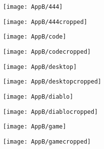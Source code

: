 \documentclass[draft,final]{vutinfth} %
\begin{document}
\begin{appendices}
			\begin{figure}[H]
			\centering
			\begin{subfigure}[b]{0.45\columnwidth}
				\centering
				\texttt{[image: AppB/444]}
			\end{subfigure}
			\begin{subfigure}[b]{0.45\columnwidth}
				\centering
				\texttt{[image: AppB/444cropped]}
			\end{subfigure}
		\end{figure}  
		\begin{figure}[H]
			\centering
			\begin{subfigure}[b]{0.45\columnwidth}
				\centering
				\texttt{[image: AppB/code]}
			\end{subfigure}
			\begin{subfigure}[b]{0.45\columnwidth}
				\centering
				\texttt{[image: AppB/codecropped]}
			\end{subfigure}
		\end{figure}
		\begin{figure}[H]
			\centering
			\begin{subfigure}[b]{0.45\columnwidth}
				\centering
				\texttt{[image: AppB/desktop]}
			\end{subfigure}
			\begin{subfigure}[b]{0.45\columnwidth}
				\centering
				\texttt{[image: AppB/desktopcropped]}
			\end{subfigure}
		\end{figure}
		\begin{figure}[H]
			\centering
			\begin{subfigure}[b]{0.45\columnwidth}
				\centering
				\texttt{[image: AppB/diablo]}
			\end{subfigure}
			\begin{subfigure}[b]{0.45\columnwidth}
				\centering
				\texttt{[image: AppB/diablocropped]}
			\end{subfigure}
		\end{figure} 
		\begin{figure}[H]
			\centering
			\begin{subfigure}[b]{0.45\columnwidth}
				\centering
				\texttt{[image: AppB/game]}
			\end{subfigure}
			\begin{subfigure}[b]{0.45\columnwidth}
				\centering
				\texttt{[image: AppB/gamecropped]}

\end{subfigure}
\end{figure}
\end{appendices}
\end{document}
